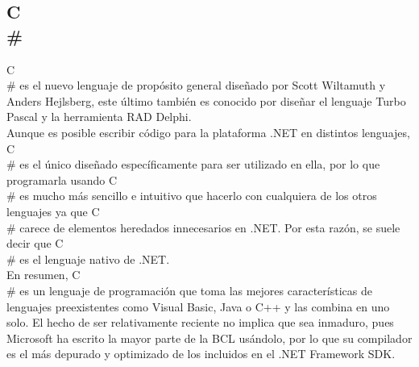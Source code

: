 \subsection{C\\#}

C\\# es el nuevo lenguaje de prop\'osito general dise\~nado por Scott Wiltamuth y Anders Hejlsberg, este \'ultimo tambi\'en es conocido por dise\~nar el lenguaje Turbo Pascal y la herramienta RAD Delphi.\\

Aunque es posible escribir c\'odigo para la plataforma .NET en distintos lenguajes, C\\# es el \'unico dise\~nado espec\'ificamente para ser utilizado en ella, por lo que programarla usando C\\# es mucho m\'as sencillo e intuitivo que hacerlo con cualquiera de los otros lenguajes ya que C\\# carece de elementos heredados innecesarios en .NET. Por esta raz\'on, se suele decir que C\\# es el lenguaje nativo de .NET.\\

En resumen, C\\# es un lenguaje de programaci\'on que toma las mejores caracter\'isticas de lenguajes preexistentes como Visual Basic, Java o C++ y las combina en uno solo. El hecho de ser relativamente reciente no implica que sea inmaduro, pues Microsoft ha escrito la mayor parte de la BCL us\'andolo, por lo que su compilador es el m\'as depurado y optimizado de los incluidos en el .NET Framework SDK.\\

